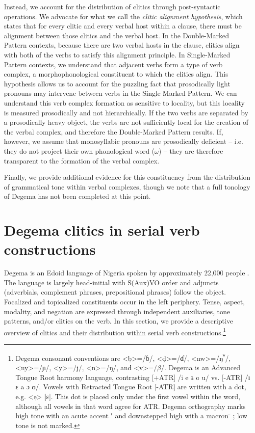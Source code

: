 \documentclass[output=paper]{langsci/langscibook}
\begin{document}
Instead, we account for the distribution of clitics through post-syntactic operations. We advocate for what we call the \textit{clitic alignment hypothesis}, which states that for every clitic and every verbal host within a clause, there must be alignment between those clitics and the verbal host. In the Double-Marked Pattern contexts, because there are two verbal hosts in the clause, clitics align with both of the verbs to satisfy this alignment principle. In Single-Marked Pattern contexts, we understand that adjacent verbs form a type of verb complex, a morphophonological constituent to which the clitics align. This hypothesis allows us to account for the puzzling fact that prosodically light pronouns may intervene between verbs in the Single-Marked Pattern. We can understand this verb complex formation as sensitive to locality, but this locality is measured prosodically and not hierarchically. If the two verbs are separated by a prosodically heavy object, the verbs are not sufficiently local for the creation of the verbal complex, and therefore the Double-Marked Pattern results. If, however, we assume that monosyllabic pronouns are prosodically deficient – i.e. they do not project their own phonological word ($\omega $) – they are therefore transparent to the formation of the verbal complex. 

Finally, we provide additional evidence for this constituency from the distribution of grammatical tone within verbal complexes, though we note that a full tonology of Degema has not been completed at this point. 

\section{Degema clitics in serial verb constructions}

Degema is an Edoid language of Nigeria spoken by approximately 22,000 people \citep[5]{Kari2004}. The language is largely head-initial with S(Aux)VO order and adjuncts (adverbials, complement phrases, prepositional phrases) follow the object. Focalized and topicalized constituents occur in the left periphery. Tense, aspect, modality, and negation are expressed through independent auxiliaries, tone patterns, and/or clitics on the verb. In this section, we provide a descriptive overview of clitics and their distribution within serial verb constructions.\footnote{Degema consonant conventions are {\textless}ḅ>=/ɓ/, {\textless}ḍ>=/ɗ/, {\textless}nw>=/ŋ\textsuperscript{ʷ}/, {\textless}ny>=/ɲ/, {\textless}y>=/j/, {\textless}\={n}>=/ŋ/, and {\textless}v>=/$\beta $/. Degema is an Advanced Tongue Root harmony language, contrasting [+ATR] /i e ɜ o u/ vs. [-ATR] /ɪ ɛ a ɔ ʊ/. Vowels with Retracted Tongue Root [-ATR] are written with a dot, e.g. {\textless}ẹ> [ɛ]. This dot is placed only under the first vowel within the word, although all vowels in that word agree for ATR. Degema orthography marks high tone with an acute accent  \'{ } and downstepped high with a macron  \={ } ; low tone is not marked.
} 
\end{document}
